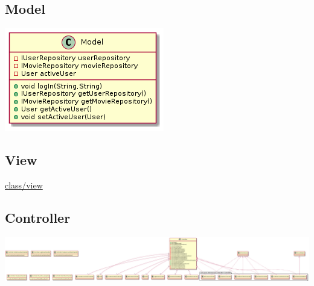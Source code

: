 \documentclass[11pt]{article}
\begin{document}
\subsection{Model}
\label{sec:org225d08f}
\begin{center}
\includegraphics[width=.9\linewidth]{class/model.png}
\end{center}
\subsection{View}
\label{sec:orgc19da58}
\url{class/view}

\subsection{Controller}
\label{sec:org445faff}
\begin{center}
\includegraphics[width=.9\linewidth]{class/controller.png}
\end{center}
\end{document}
